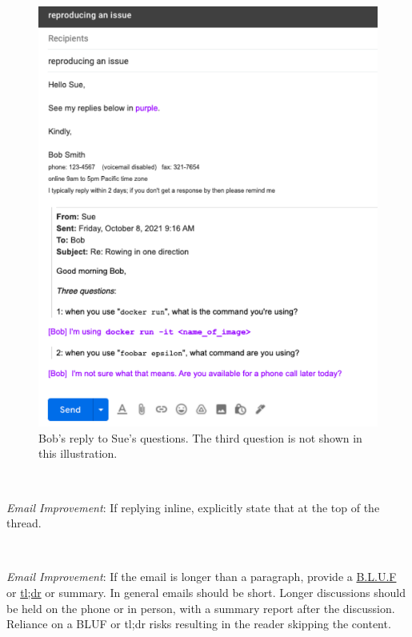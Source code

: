 \begin{figure}[H] %
\includegraphics[width=1\textwidth]{images/email_reply.pdf}
\caption{Bob's reply to Sue's questions. The third question is not shown in this illustration.}
\label{fig:email_reply}
\end{figure}

\ \\
\begin{samepage}
\textit{Email Improvement}: If replying inline, explicitly state that at the top of the thread.
\end{samepage}

\ \\
\begin{samepage}
\textit{Email Improvement}: If the email is longer than a paragraph, provide a \href{https://en.wikipedia.org/wiki/BLUF_(communication)}{B.L.U.F} 
\iftoggle{WPinmargin}{\marginpar{[Wikipedia] BLUF}}{}
or 
\href{https://en.wikipedia.org/wiki/Wikipedia:Too_long;_didn\%27t_read}{tl;dr} 
or summary. In general emails should be short. Longer discussions should be held on the phone or in person, with a summary report after the discussion. Reliance on a BLUF or tl;dr risks resulting in the reader skipping the content. 
\end{samepage}

